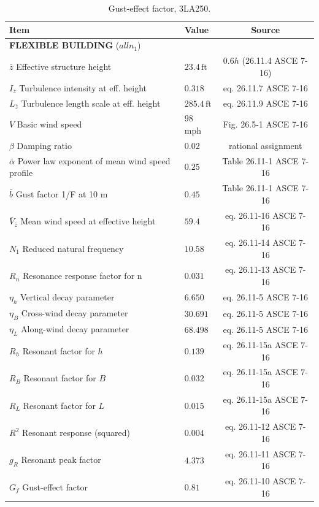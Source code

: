 \documentclass[onecolumn, fleqn]{article}
\newcommand{\ft}{\ensuremath{\,\mathrm{ft}}}
\begin{document}
\begin{table}[H]
\centering \caption{Gust-effect factor, 3LA250.}
\label{tab:gust_factor_3SE250}
\begin{tabular}{llc}
\toprule
Item		& Value		& Source		\\
\midrule
\multicolumn{3}{l}{\textbf{FLEXIBLE BUILDING} ($all n_1$)}	\\
$\bar{z}$ Effective structure height							& $23.4 \ft$					& $0.6h$ (26.11.4 ASCE 7-16)	\\
$I_{\bar{z}}$ Turbulence intensity at eff. height				& $0.318$						& eq. 26.11.7 ASCE 7-16			\\
$L_{\bar{z}}$ Turbulence length scale at eff. height			& $285.4 \ft$					& eq. 26.11.9 ASCE 7-16			\\
$V$ Basic wind speed											& $98$ mph						& Fig. 26.5-1 ASCE 7-16			\\
$\beta$ Damping ratio											& $0.02$						& rational assignment			\\
$\bar{\alpha}$ Power law exponent of mean wind speed profile	& $0.25$						& Table 26.11-1 ASCE 7-16		\\
$\bar{b}$ Gust factor 1/F at 10 m								& $0.45$						& Table 26.11-1 ASCE 7-16		\\
$\bar{V}_{\bar{z}}$ Mean wind speed at effective height			& $59.4$						& eq. 26.11-16 ASCE 7-16		\\
$N_1$ Reduced natural frequency									& $10.58$						& eq. 26.11-14 ASCE 7-16		\\
$R_n$ Resonance response factor for n							& $0.031$						& eq. 26.11-13 ASCE 7-16		\\
$\eta_h$ Vertical decay parameter								& $6.650$						& eq. 26.11-5 ASCE 7-16			\\
$\eta_B$ Cross-wind decay parameter								& $30.691$						& eq. 26.11-5 ASCE 7-16			\\
$\eta_L$ Along-wind decay parameter								& $68.498$						& eq. 26.11-5 ASCE 7-16			\\
$R_h$ Resonant factor for $h$									& $0.139$							& eq. 26.11-15a ASCE 7-16			\\
$R_B$ Resonant factor for $B$									& $0.032$							& eq. 26.11-15a ASCE 7-16			\\
$R_L$ Resonant factor for $L$									& $0.015$							& eq. 26.11-15a ASCE 7-16			\\
$R^2$ Resonant response (squared)								& $0.004$							& eq. 26.11-12 ASCE 7-16			\\
$g_R$ Resonant peak factor										& $4.373$							& eq. 26.11-11 ASCE 7-16			\\
$G_f$ Gust-effect factor										& $0.81$							& eq. 26.11-10 ASCE 7-16			\\
\bottomrule
\end{tabular}
\end{table}
\end{document}

